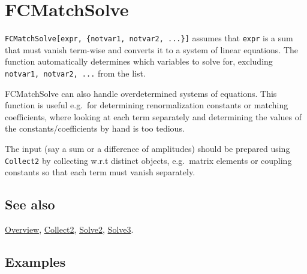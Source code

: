 \documentclass[../FeynCalcManual.tex]{subfiles}
\begin{document}
\hypertarget{fcmatchsolve}{
\section{FCMatchSolve}\label{fcmatchsolve}}

\texttt{FCMatchSolve[\allowbreak{}expr,\ \allowbreak{}\{\allowbreak{}notvar1,\ \allowbreak{}notvar2,\ \allowbreak{}...\}]}
assumes that \texttt{expr} is a sum that must vanish term-wise and
converts it to a system of linear equations. The function automatically
determines which variables to solve for, excluding
\texttt{notvar1,\ \allowbreak{}notvar2,\ \allowbreak{}...} from the
list.

FCMatchSolve can also handle overdetermined systems of equations. This
function is useful e.g.~for determining renormalization constants or
matching coefficients, where looking at each term separately and
determining the values of the constants/coefficients by hand is too
tedious.

The input (say a sum or a difference of amplitudes) should be prepared
using \texttt{Collect2} by collecting w.r.t distinct objects,
e.g.~matrix elements or coupling constants so that each term must vanish
separately.

\subsection{See also}

\hyperlink{toc}{Overview}, \hyperlink{collect2}{Collect2},
\hyperlink{solve2}{Solve2}, \hyperlink{solve3}{Solve3}.

\subsection{Examples}
\end{document}
